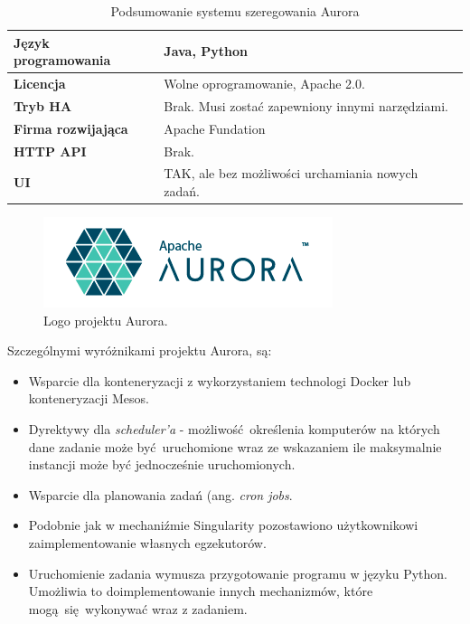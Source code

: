 \documentclass[10pt,a4paper,titlepage,twoside]{report}
\begin{document}
\begin{table}[!h]
\caption{Podsumowanie systemu szeregowania Aurora}
\label{aurora_info}
\centering
\begin{tabular}{|p{4cm}|p{6cm}|}
  \hline
  \textbf{Język programowania} & Java, Python \\
  \hline
  \textbf{Licencja} & Wolne oprogramowanie, Apache 2.0. \\
  \hline
  \textbf{Tryb HA} & Brak. Musi zostać zapewniony innymi narzędziami. \\
  \hline
  \textbf{Firma rozwijająca} & Apache Fundation \\
  \hline
  \textbf{HTTP API} & Brak. \\
  \hline
  \textbf{UI} & TAK, ale bez możliwości urchamiania nowych zadań. \\
  \hline
\end{tabular}
\end{table}

\begin{figure}[!h]
	\centering
	\includegraphics[scale=1]{pics/aurora_logo.png}
	\caption{Logo projektu Aurora.}
	\label{aurora_logo}
\end{figure}

Szczególnymi wyróżnikami projektu Aurora, są:
\begin{itemize}
\item Wsparcie dla konteneryzacji z wykorzystaniem technologi Docker lub konteneryzacji Mesos.
\item Dyrektywy dla \textit{scheduler'a} - możliwość określenia komputerów na których dane zadanie może być uruchomione wraz ze wskazaniem ile maksymalnie instancji może być jednocześnie uruchomionych.
\item Wsparcie dla planowania zadań (ang. \textit{cron jobs}.
\item Podobnie jak w mechaniźmie Singularity pozostawiono użytkownikowi zaimplementowanie własnych egzekutorów.
\item Uruchomienie zadania wymusza przygotowanie programu w języku Python. Umożliwia to doimplementowanie innych mechanizmów, które mogą się wykonywać wraz z zadaniem.
\end{itemize}
\end{document}
